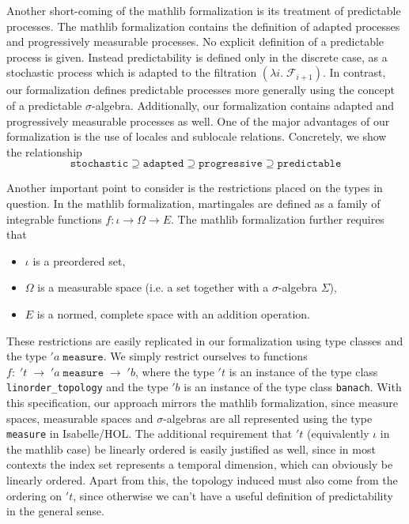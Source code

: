 Another short-coming of the \textsf{mathlib} formalization is its treatment of predictable processes. The \textsf{mathlib} formalization contains the definition of adapted processes and progressively measurable processes. No explicit definition of a predictable process is given. Instead predictability is defined only in the discrete case, as a stochastic process which is adapted to the filtration $(\lambda i. \; \mathcal{F}_{i + 1})$. In contrast, our formalization defines predictable processes more generally using the concept of a predictable $\sigma$-algebra. Additionally, our formalization contains adapted and progressively measurable processes as well. One of the major advantages of our formalization is the use of locales and sublocale relations. Concretely, we show the relationship 
\[
	\texttt{stochastic} \supseteq \texttt{adapted} \supseteq \texttt{progressive} \supseteq \texttt{predictable}
\]

Another important point to consider is the restrictions placed on the types in question. In the \textsf{mathlib} formalization, martingales are defined as a family of integrable functions $f : \iota \rightarrow \Omega \rightarrow E$. The \textsf{mathlib} formalization further requires that
\begin{itemize}
\item $\iota$ is a preordered set,
\item $\Omega$ is a measurable space (i.e. a set together with a $\sigma$-algebra $\Sigma$),
\item $E$ is a normed, complete space with an addition operation.
\end{itemize}

These restrictions are easily replicated in our formalization using type classes and the type $'a \;\texttt{measure}$. We simply restrict ourselves to functions $f : \; 't \;\rightarrow \; 'a \;\texttt{measure} \;\rightarrow\; 'b$, where the type $'t$ is an instance of the type class \texttt{linorder\_topology} and the type $'b$ is an instance of the type class \texttt{banach}. With this specification, our approach mirrors the \textsf{mathlib} formalization, since measure spaces, measurable spaces and $\sigma$-algebras are all represented using the type \texttt{measure} in Isabelle/HOL. The additional requirement that $'t$ (equivalently $\iota$ in the \textsf{mathlib} case) be linearly ordered is easily justified as well, since in most contexts the index set represents a temporal dimension, which can obviously be linearly ordered. Apart from this, the topology induced must also come from the ordering on $'t$, since otherwise we can't have a useful definition of predictability in the general sense.

